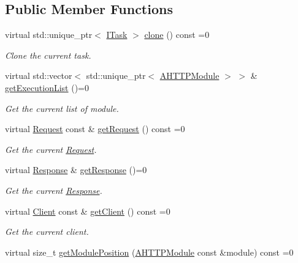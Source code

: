\subsection*{Public Member Functions}
\begin{DoxyCompactItemize}
\item 
virtual std\+::unique\+\_\+ptr$<$ \mbox{\hyperlink{classxzia_1_1ITask}{I\+Task}} $>$ \mbox{\hyperlink{classxzia_1_1ITask_a7368f69854dd9af5af668e036560226d}{clone}} () const =0
\begin{DoxyCompactList}\small\item\em Clone the current task. \end{DoxyCompactList}\item 
virtual std\+::vector$<$ std\+::unique\+\_\+ptr$<$ \mbox{\hyperlink{classxzia_1_1AHTTPModule}{A\+H\+T\+T\+P\+Module}} $>$ $>$ \& \mbox{\hyperlink{classxzia_1_1ITask_a100285f59380ad90225231734c9a29ab}{get\+Execution\+List}} ()=0
\begin{DoxyCompactList}\small\item\em Get the current list of module. \end{DoxyCompactList}\item 
virtual \mbox{\hyperlink{structxzia_1_1Request}{Request}} const  \& \mbox{\hyperlink{classxzia_1_1ITask_aeac67e104b125e2a9c03ec8a3cd80296}{get\+Request}} () const =0
\begin{DoxyCompactList}\small\item\em Get the current \mbox{\hyperlink{structxzia_1_1Request}{Request}}. \end{DoxyCompactList}\item 
virtual \mbox{\hyperlink{structxzia_1_1Response}{Response}} \& \mbox{\hyperlink{classxzia_1_1ITask_a5bd63caed103f8bf8b6d76a9a802a927}{get\+Response}} ()=0
\begin{DoxyCompactList}\small\item\em Get the current \mbox{\hyperlink{structxzia_1_1Response}{Response}}. \end{DoxyCompactList}\item 
virtual \mbox{\hyperlink{structClient}{Client}} const  \& \mbox{\hyperlink{classxzia_1_1ITask_a2fa35ad0ca8d373c4efd6e928755b5e7}{get\+Client}} () const =0
\begin{DoxyCompactList}\small\item\em Get the current client. \end{DoxyCompactList}\item 
virtual size\+\_\+t \mbox{\hyperlink{classxzia_1_1ITask_a74496410e5dbd3c293082af3d5e7d84f}{get\+Module\+Position}} (\mbox{\hyperlink{classxzia_1_1AHTTPModule}{A\+H\+T\+T\+P\+Module}} const \&module) const =0

\end{DoxyCompactItemize}
